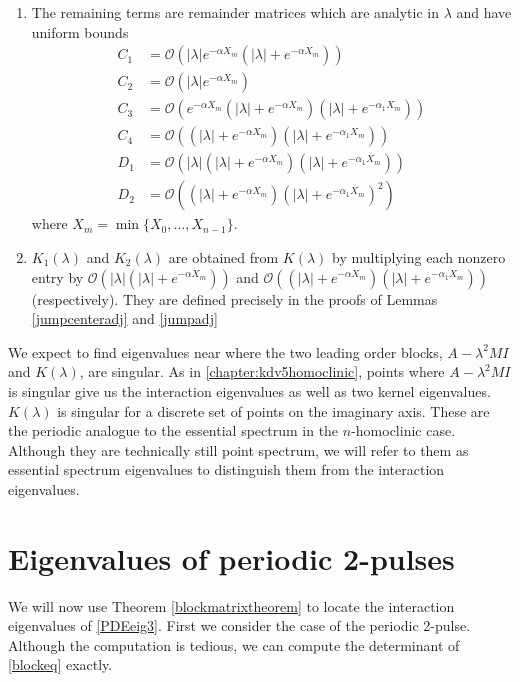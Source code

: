 \documentclass[thesis.tex]{subfiles}
\begin{document}
\begin{theorem}
\begin{enumerate}
\item The remaining terms are remainder matrices which are analytic in $\lambda$ and have uniform bounds
\begin{align*}
C_1 &= \mathcal{O}(|\lambda|e^{-\alpha X_m}(|\lambda| + e^{-\alpha X_m})) \\
C_2 &= \mathcal{O}(|\lambda|e^{-\alpha X_m}) \\
C_3 &= \mathcal{O}(e^{-\alpha X_m} (|\lambda| + e^{-\alpha X_m})(|\lambda| + e^{-\alpha_1 X_m}))  \\
C_4 &= \mathcal{O}((|\lambda| + e^{-\alpha X_m})(|\lambda| + e^{-\alpha_1 X_m})) \\
D_1 &= \mathcal{O}(|\lambda|(|\lambda| + e^{-\alpha X_m})(|\lambda| + e^{-\alpha_1 X_m})) \\
D_2 &= \mathcal{O}((|\lambda| + e^{-\alpha X_m})(|\lambda| + e^{-\alpha_1 X_m})^2)
\end{align*}
where $X_m = \min\{X_0, \dots, X_{n-1}\}$.

\item $K_1(\lambda)$ and $K_2(\lambda)$ are obtained from $K(\lambda)$ by multiplying each nonzero entry by $\mathcal{O}(|\lambda|(|\lambda| + e^{-\alpha X_m}))$ and $\mathcal{O}((|\lambda| + e^{-\alpha X_m})(|\lambda| + e^{-\alpha_1 X_m}))$ (respectively). They are defined precisely in the proofs of Lemmas \ref{jumpcenteradj} and \ref{jumpadj}
\end{enumerate}
\end{theorem}

We expect to find eigenvalues near where the two leading order blocks, $A - \lambda^2 MI$ and $K(\lambda)$, are singular. As in \cref{chapter:kdv5homoclinic}, points where $A - \lambda^2 MI$ is singular give us the interaction eigenvalues as well as two kernel eigenvalues. $K(\lambda)$ is singular for a discrete set of points on the imaginary axis. These are the periodic analogue to the essential spectrum in the $n$-homoclinic case. Although they are technically still point spectrum, we will refer to them as essential spectrum eigenvalues to distinguish them from the interaction eigenvalues.

\section{Eigenvalues of periodic 2-pulses}

We will now use Theorem \ref{blockmatrixtheorem} to locate the interaction eigenvalues of \eqref{PDEeig3}. First we consider the case of the periodic 2-pulse. Although the computation is tedious, we can compute the determinant of \cref{blockeq} exactly. 
\end{document}
